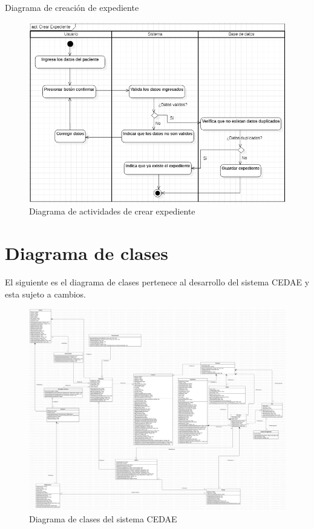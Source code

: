 \documentclass[12pt,letterpaper]{article}
\begin{document}
        \newpage
        Diagrama de creación de expediente
        \begin{figure}[H]
            \centering
            \includegraphics [scale=0.7]{actividades/crearExpediente}
            \caption{Diagrama de actividades de crear expediente}
        \end{figure}
    
    \newpage
    \section{Diagrama de clases}
        El siguiente es el diagrama de clases pertenece al desarrollo del sistema CEDAE y esta sujeto a cambios.
        
        \begin{figure}[H]
            \centering
            \includegraphics [scale=0.13]{clases/diagramaClases}
            \caption{Diagrama de clases del sistema CEDAE}
        \end{figure}
\end{document}
